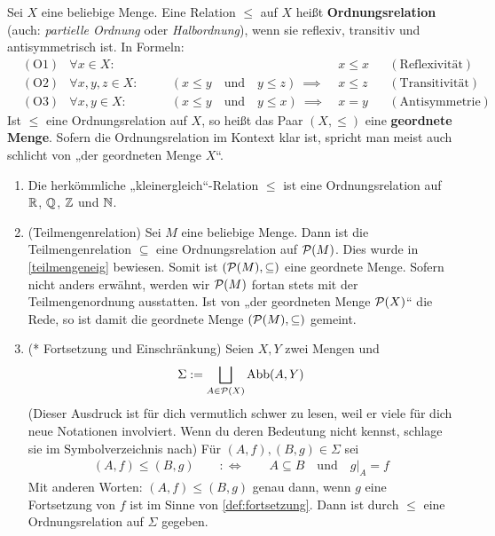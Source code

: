 \begin{de}[Ordnungsrelationen]    
    Sei $X$ eine beliebige Menge. Eine Relation $\le$ auf $X$ heißt \textbf{Ordnungsrelation} (auch: \emph{partielle Ordnung} oder \emph{Halbordnung}), wenn sie reflexiv, transitiv und antisymmetrisch ist. In Formeln:
    \begin{align*}
        & (\text{O1}) & \forall x\in X:&&\quad &x\le x && (\text{Reflexivität}) \\
        & (\text{O2}) & \forall x,y,z\in X:&&\quad (x\le y\quad \text{und}\quad y\le z)\ \implies\ & x\le z && (\text{Transitivität}) \\
        & (\text{O3}) & \forall x,y\in X:&&\quad  (x\le y\quad \text{und}\quad y\le x)\ \implies\ & x=y && (\text{Antisymmetrie})
    \end{align*}
    Ist $\le$ eine Ordnungsrelation auf $X$, so heißt das Paar $(X,\le)$ eine \textbf{geordnete Menge}. Sofern die Ordnungsrelation im Kontext klar ist, spricht man meist auch schlicht von „der geordneten Menge $X$“.
\end{de}


\begin{bsp} \quad
    \begin{enumerate}
        \item Die herkömmliche „kleinergleich“-Relation $\le$ ist eine Ordnungsrelation auf $\mathbb R$, $\mathbb Q$, $\mathbb Z$ und $\mathbb N$.
        \item(Teilmengenrelation) Sei $M$ eine beliebige Menge. Dann ist die Teilmengenrelation $\subseteq$ eine Ordnungsrelation auf $\mathcal P(M)$. Dies wurde in \cref{teilmengeneig} bewiesen. Somit ist $(\mathcal P(M),\subseteq)$ eine geordnete Menge. Sofern nicht anders erwähnt, werden wir $\mathcal P(M)$ fortan stets mit der Teilmengenordnung ausstatten. Ist von „der geordneten Menge $\mathcal P(X)$“ die Rede, so ist damit die geordnete Menge $(\mathcal P(M),\subseteq)$ gemeint.
        \item(* Fortsetzung und Einschränkung) Seien $X,Y$ zwei Mengen und
            \[ \Sigma := \bigsqcup_{A\in \mathcal P(X)} \operatorname{Abb}(A,Y) \]
        (Dieser Ausdruck ist für dich vermutlich schwer zu lesen, weil er viele für dich neue Notationen involviert. Wenn du deren Bedeutung nicht kennst, schlage sie im Symbolverzeichnis nach)
        Für $(A,f),(B,g)\in\Sigma$ sei
        \begin{align*}
            (A,f) \le (B,g) \qquad:\Leftrightarrow\qquad A\subseteq B\quad \text{und}\quad g\vert_A=f
        \end{align*}
        Mit anderen Worten: $(A,f)\le (B,g)$ genau dann, wenn $g$ eine Fortsetzung von $f$ ist im Sinne von \cref{def:fortsetzung}. Dann ist durch $\le$ eine Ordnungsrelation auf $\Sigma$ gegeben.
    \end{enumerate}
\end{bsp}



